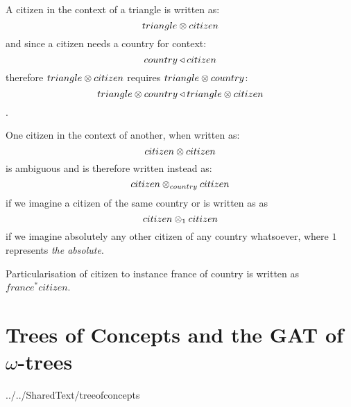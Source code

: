 \documentclass[10pt,a4paper]{article}
\begin{document}
A citizen in the context of a triangle is written as:
$$
triangle \otimes citizen
$$
and since a citizen needs a country for context:
$$
country \triangleleft citizen
$$
 therefore $triangle \otimes citizen$ requires $triangle \otimes country$:
$$ triangle \otimes country \triangleleft triangle \otimes citizen$$.


One citizen in the context of another, when written as:
$$citizen \otimes citizen$$
is ambiguous and is therefore written instead as:
$$citizen \otimes_{country} citizen$$
if we imagine a citizen of the same country or is written as as
$$citizen \otimes_1 citizen$$
if we imagine absolutely any other citizen of any country whatsoever, 
where $1$ represents \textit{the absolute}. 

Particularisation of  citizen to instance france of country is written as
$france^*citizen$.



\section{Trees of Concepts and the GAT of $\omega$-trees}
 {../../SharedText/treeofconcepts}



\end{document}
